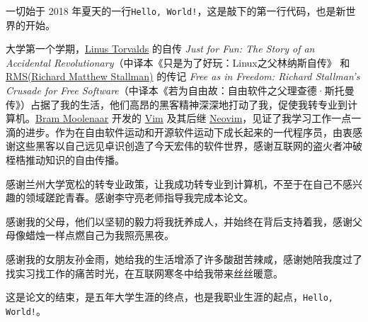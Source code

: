 \documentclass[AutoFakeBold]{LZUThesis}
\begin{document}
\begin{sloppypar}
\backmatter


\printbib






\Thanks

一切始于 2018 年夏天的一行\texttt{Hello, World!}，这是敲下的第一行代码，也是新世界的开始。

大学第一个学期，\hyperlink{https://linuxtorvalds.com/}{Linus Torvalds} 的自传 \textit{Just for Fun: The Story of an Accidental Revolutionary}（中译本《只是为了好玩：Linux之父林纳斯自传》 和 \hyperlink{https://stallman.org/}{RMS(Richard Matthew Stallman)} 的传记 \textit{Free as in Freedom: Richard Stallman's Crusade for Free Software}（中译本《若为自由故：自由软件之父理查德·斯托曼传》）占据了我的生活，他们高昂的黑客精神深深地打动了我，促使我转专业到计算机。\hyperlink{https://www.moolenaar.net/}{Bram Moolenaar} 开发的 \hyperlink{https://www.vim.org/}{Vim} 及其后继 \hyperlink{https://neovim.io/}{Neovim}，见证了我学习工作一点一滴的进步。作为在自由软件运动和开源软件运动下成长起来的一代程序员，由衷感谢这些黑客以自己远见卓识创造了今天宏伟的软件世界，感谢互联网的盗火者冲破桎梏推动知识的自由传播。

感谢兰州大学宽松的转专业政策，让我成功转专业到计算机，不至于在自己不感兴趣的领域蹉跎青春。感谢李守亮老师指导我完成本论文。

感谢我的父母，他们以坚韧的毅力将我抚养成人，并始终在背后支持着我，感谢父母像蜡烛一样点燃自己为我照亮黑夜。

感谢我的女朋友孙金雨，她给我的生活增添了许多酸甜苦辣咸，感谢她陪我度过了找实习找工作的痛苦时光，在互联网寒冬中给我带来丝丝暖意。

这是论文的结束，是五年大学生涯的终点，也是我职业生涯的起点，\texttt{Hello, World!}。

\Grade %

\end{sloppypar}
\end{document}
